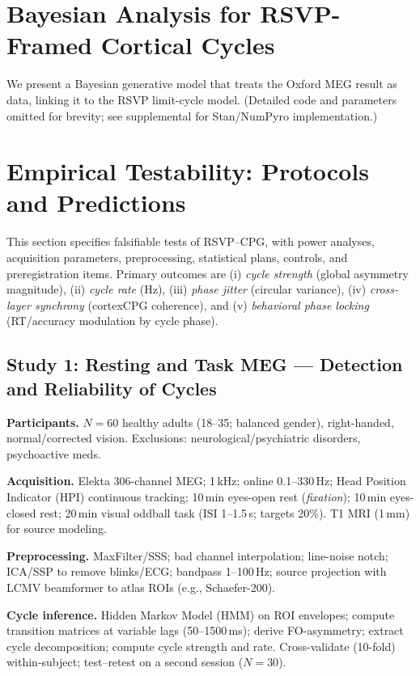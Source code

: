 \documentclass{article}
\begin{document}
\section{Bayesian Analysis for RSVP-Framed Cortical Cycles}

We present a Bayesian generative model that treats the Oxford MEG result as data, linking it to the RSVP limit-cycle model. (Detailed code and parameters omitted for brevity; see supplemental for Stan/NumPyro implementation.)
\section{Empirical Testability: Protocols and Predictions}
\label{sec:empirical}

This section specifies falsifiable tests of RSVP--CPG, with power analyses, acquisition parameters, preprocessing, statistical plans, controls, and preregistration items. Primary outcomes are (i) \emph{cycle strength} (global asymmetry magnitude), (ii) \emph{cycle rate} (Hz), (iii) \emph{phase jitter} (circular variance), (iv) \emph{cross-layer synchrony} (cortex{\textrightarrow}CPG coherence), and (v) \emph{behavioral phase locking} (RT/accuracy modulation by cycle phase).

\subsection{Study 1: Resting and Task MEG --- Detection and Reliability of Cycles}
\textbf{Participants.} $N{=}60$ healthy adults (18--35; balanced gender), right-handed, normal/corrected vision. Exclusions: neurological/psychiatric disorders, psychoactive meds.

\textbf{Acquisition.} Elekta 306-channel MEG; 1\,kHz; online 0.1--330\,Hz; Head Position Indicator (HPI) continuous tracking; 10\,min eyes-open rest (\emph{fixation}); 10\,min eyes-closed rest; 20\,min visual oddball task (ISI 1--1.5\,s; targets 20\%). T1 MRI (1\,mm) for source modeling.

\textbf{Preprocessing.} MaxFilter/SSS; bad channel interpolation; line-noise notch; ICA/SSP to remove blinks/ECG; bandpass 1--100\,Hz; source projection with LCMV beamformer to atlas ROIs (e.g., Schaefer-200).

\textbf{Cycle inference.} Hidden Markov Model (HMM) on ROI envelopes; compute transition matrices at variable lags (50--1500\,ms); derive FO-asymmetry; extract cycle decomposition; compute cycle strength and rate. Cross-validate (10-fold) within-subject; test--retest on a second session ($N{=}30$).
\end{document}
